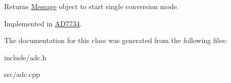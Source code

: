 Returns \mbox{\hyperlink{structAdcSpi_1_1Message}{Message}} object to start single conversion mode. 

Implemented in \mbox{\hyperlink{classAD7734_a6ac58d1c41ad0562329a932d464bfce1}{A\+D7734}}.



The documentation for this class was generated from the following files\+:\begin{DoxyCompactItemize}
\item 
include/adc.\+h\item 
src/adc.\+cpp\end{DoxyCompactItemize}
